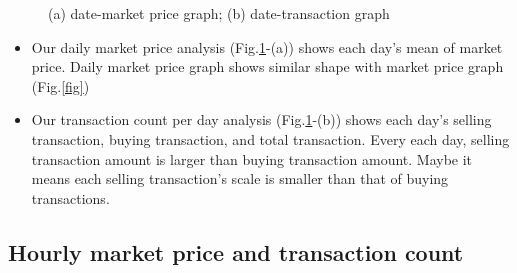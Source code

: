 \documentclass[conference]{IEEEtran}
\begin{document}
\begin{figure}[htbp]
\centering
{}
\caption{(a) date-market price graph; (b) date-transaction graph}
\label{fig:daily}
\vspace{-0.5cm}
\end{figure}

\begin{itemize}
\item Our daily market price analysis (Fig.\ref{fig:daily}-(a)) shows each day's mean of market price. Daily market price graph shows similar shape with market price graph (Fig.\ref{fig})
\item Our transaction count per day analysis (Fig.\ref{fig:daily}-(b)) shows each day's selling transaction, buying transaction, and total transaction. Every each day, selling transaction amount is larger than buying transaction amount. Maybe it means each selling transaction's scale is smaller than that of buying transactions.
\end{itemize}

\subsection{Hourly market price and transaction count}
\end{document}
